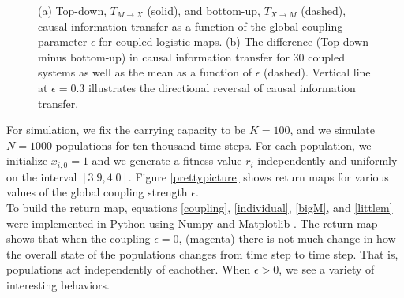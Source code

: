 \documentclass[conference]{IEEEtran}
\begin{document}
\begin{figure}[!t]
\centering
{}
\hfill
{}
\caption{(a) Top-down, $T_{M\rightarrow X}$ (solid), and bottom-up, $T_{X\rightarrow M}$ (dashed), causal information transfer as a function of the global coupling parameter $\epsilon$ for coupled logistic maps. (b) The difference (Top-down minus bottom-up) in causal information transfer for $30$ coupled systems as well as the mean as a function of $\epsilon$ (dashed). Vertical line at $\epsilon = 0.3$ illustrates the directional reversal of causal information transfer.}
\label{te_avg}
\end{figure}
\noindent 
For simulation, we fix the carrying capacity to be $K=100$, and we simulate $N=1000$ populations for ten-thousand time steps. For each population, we initialize $x_{i, 0} = 1$ and we generate a fitness value $r_i$ independently and uniformly on the interval $[3.9, 4.0]$. Figure \ref{prettypicture} shows return maps for various values of the global coupling strength $\epsilon$.  \\



\noindent To build the return map, equations \ref{coupling},  \ref{individual}, \ref{bigM},  and \ref{littlem} were implemented  in Python using Numpy \cite{numpy} and Matplotlib \cite{matplotlib}.   The return map shows that when the coupling $\epsilon = 0$,  (magenta) there is not much change in how the overall state of the populations changes from time step to time step.  That is, populations  act independently of eachother.   When $\epsilon > 0$, we see a variety of interesting behaviors. 
\end{document}
